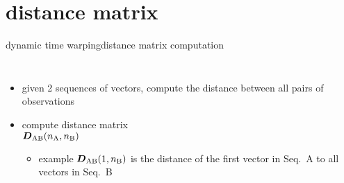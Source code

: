     \section[distance]{distance matrix}
        \begin{frame}{dynamic time warping}{distance matrix computation}
           \vspace{-3mm}
            \begin{columns}[T]
                \begin{itemize}
                    \item   given 2 sequences of vectors, compute the distance between all pairs of observations
                    \smallskip
                    \item<1->	compute distance matrix\\ $\mat{D}_{\mathrm{AB}}(n_\mathrm{A},n_\mathrm{B})$
                    \smallskip
                        \begin{itemize}
                            \item   example  $\mat{D}_{\mathrm{AB}}(1,n_\mathrm{B})$ is the distance of the first vector in Seq.\ A to all vectors in Seq.\ B
                        \end{itemize}
                \end{itemize}
                \vspace{-7mm}
            \end{columns}
        \end{frame}

